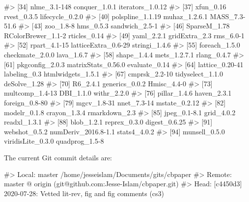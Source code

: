 \documentclass[
]{jss}
\begin{document}
\begin{CodeChunk}
\begin{CodeOutput}
#> [34] nlme_3.1-148        conquer_1.0.1       iterators_1.0.12   
#> [37] xfun_0.16           rvest_0.3.5         lifecycle_0.2.0    
#> [40] polspline_1.1.19    muhaz_1.2.6.1       MASS_7.3-51.6      
#> [43] zoo_1.8-8           hms_0.5.3           sandwich_2.5-1     
#> [46] SparseM_1.78        RColorBrewer_1.1-2  rticles_0.14       
#> [49] yaml_2.2.1          gridExtra_2.3       rms_6.0-1          
#> [52] rpart_4.1-15        latticeExtra_0.6-29 stringi_1.4.6      
#> [55] foreach_1.5.0       checkmate_2.0.0     lava_1.6.7         
#> [58] shape_1.4.4         mets_1.2.7.1        rlang_0.4.7        
#> [61] pkgconfig_2.0.3     matrixStats_0.56.0  evaluate_0.14      
#> [64] lattice_0.20-41     labeling_0.3        htmlwidgets_1.5.1  
#> [67] cmprsk_2.2-10       tidyselect_1.1.0    deSolve_1.28       
#> [70] R6_2.4.1            generics_0.0.2      Hmisc_4.4-0        
#> [73] multcomp_1.4-13     DBI_1.1.0           withr_2.2.0        
#> [76] pillar_1.4.6        haven_2.3.1         foreign_0.8-80     
#> [79] mgcv_1.8-31         nnet_7.3-14         mstate_0.2.12      
#> [82] modelr_0.1.8        crayon_1.3.4        rmarkdown_2.3      
#> [85] jpeg_0.1-8.1        grid_4.0.2          readxl_1.3.1       
#> [88] blob_1.2.1          reprex_0.3.0        digest_0.6.25      
#> [91] webshot_0.5.2       numDeriv_2016.8-1.1 stats4_4.0.2       
#> [94] munsell_0.5.0       viridisLite_0.3.0   quadprog_1.5-8
\end{CodeOutput}
\end{CodeChunk}

The current Git commit details are:

\begin{CodeChunk}

\begin{CodeOutput}
#> Local:    master /home/jesseislam/Documents/gits/cbpaper
#> Remote:   master @ origin (git@github.com:Jesse-Islam/cbpaper.git)
#> Head:     [c4450d3] 2020-07-28: Vetted lit-rev, fig and fig comments (cs3)
\end{CodeOutput}
\end{CodeChunk}


\end{document}
